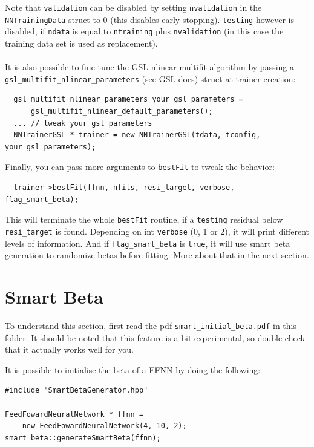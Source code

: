\documentclass[11pt,a4paper,twoside]{article}
\begin{document}
Note that \verb+validation+ can be disabled by setting \verb+nvalidation+ in the
\\\verb+NNTrainingData+ struct to 0 (this disables early stopping). \verb+testing+ however is disabled, if
\verb+ndata+ is equal to \verb+ntraining+ plus \verb+nvalidation+ (in this case
the training data set is used as replacement).
\\\\It is also possible to fine tune the GSL nlinear multifit algorithm by passing a
\verb+gsl_multifit_nlinear_parameters+ (see GSL docs) struct at trainer
creation:

\begin{lstlisting}
  gsl_multifit_nlinear_parameters your_gsl_parameters =
      gsl_multifit_nlinear_default_parameters();
  ... // tweak your gsl parameters
  NNTrainerGSL * trainer = new NNTrainerGSL(tdata, tconfig, your_gsl_parameters);
\end{lstlisting}
Finally, you can pass more arguments to \verb+bestFit+ to tweak the behavior:

\begin{lstlisting}
  trainer->bestFit(ffnn, nfits, resi_target, verbose, flag_smart_beta);
\end{lstlisting}
This will terminate the whole \verb+bestFit+ routine, if a \verb+testing+
residual below \verb+resi_target+ is found. Depending on int \verb+verbose+ (0,
1 or 2), it will print different levels of information. And if
\verb+flag_smart_beta+ is \verb+true+, it will use smart beta generation to
randomize betas before fitting. More about that in the next section. 



\section{Smart Beta} %
\label{sec:smart_beta}

To understand this section, first read the pdf \verb+smart_initial_beta.pdf+ in
this folder. It should be noted that this feature is a bit experimental, so
double check that it actually works well for you.

It is possible to initialise the beta of a FFNN by doing the following:
\begin{lstlisting}
#include "SmartBetaGenerator.hpp"

FeedFowardNeuralNetwork * ffnn =
    new FeedFowardNeuralNetwork(4, 10, 2);
smart_beta::generateSmartBeta(ffnn);
\end{lstlisting}
\end{document}
